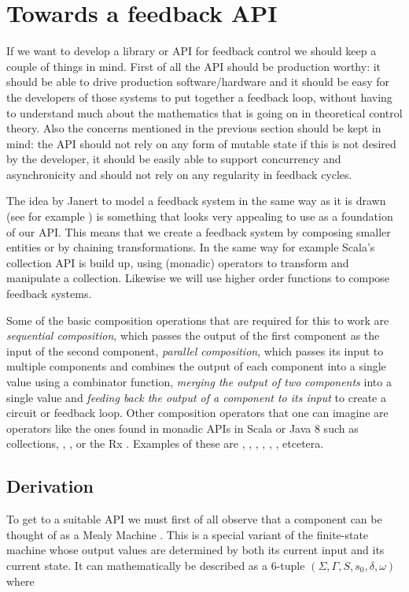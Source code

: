 \section{Towards a feedback API}
If we want to develop a library or API for feedback control we should keep a couple of things in mind. First of all the API should be production worthy: it should be able to drive production software/hardware and it should be easy for the developers of those systems to put together a feedback loop, without having to understand much about the mathematics that is going on in theoretical control theory. Also the concerns mentioned in the previous section should be kept in mind: the API should not rely on any form of mutable state if this is not desired by the developer, it should be easily able to support concurrency and asynchronicity and should not rely on any regularity in feedback cycles.

The idea by Janert to model a feedback system in the same way as it is drawn (see for example ) is something that looks very appealing to use as a foundation of our API. This means that we create a feedback system by composing smaller entities or by chaining transformations. In the same way for example Scala's collection API is build up, using (monadic) operators to transform and manipulate a collection. Likewise we will use higher order functions to compose feedback systems.

Some of the basic composition operations that are required for this to work are \textit{sequential composition}, which passes the output of the first component as the input of the second component, \textit{parallel composition}, which passes its input to multiple components and combines the output of each component into a single value using a combinator function, \textit{merging the output of two components} into a single value and \textit{feeding back the output of a component to its input} to create a circuit or feedback loop. Other composition operators that one can imagine are operators like the ones found in monadic APIs in Scala or Java 8 such as collections, , ,  or the Rx \obs. Examples of these are , , , , , , etcetera.

\subsection{Derivation}
\label{subsec:api-derivation}
To get to a suitable API we must first of all observe that a component can be thought of as a Mealy Machine \cite{mealy1955-mealymachine}. This is a special variant of the finite-state machine whose output values are determined by both its current input and its current state. It can mathematically be described as a 6-tuple $(\Sigma, \Gamma, S, s_0, \delta, \omega)$ \cite{carroll1989-theoryoffiniteautomata} where

